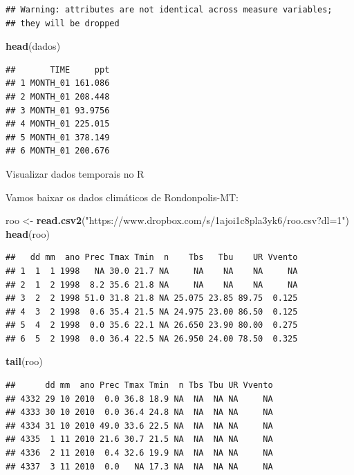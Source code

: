 \documentclass[
]{book}
\newenvironment{Shaded}{\begin{snugshade}}{\end{snugshade}}
\newcommand{\KeywordTok}[1]{\textcolor[rgb]{0.13,0.29,0.53}{\textbf{#1}}}
\newcommand{\NormalTok}[1]{#1}
\newcommand{\StringTok}[1]{\textcolor[rgb]{0.31,0.60,0.02}{#1}}
\begin{document}
\begin{verbatim}
## Warning: attributes are not identical across measure variables;
## they will be dropped
\end{verbatim}

\begin{Shaded}
\begin{Highlighting}[]
\KeywordTok{head}\NormalTok{(dados)}
\end{Highlighting}
\end{Shaded}

\begin{verbatim}
##       TIME     ppt
## 1 MONTH_01 161.086
## 2 MONTH_01 208.448
## 3 MONTH_01 93.9756
## 4 MONTH_01 225.015
## 5 MONTH_01 378.149
## 6 MONTH_01 200.676
\end{verbatim}

Visualizar dados temporais no R

Vamos baixar os dados climáticos de Rondonpolis-MT:

\begin{Shaded}
\begin{Highlighting}[]
\NormalTok{roo <-}\StringTok{ }\KeywordTok{read.csv2}\NormalTok{(}\StringTok{"https://www.dropbox.com/s/1ajoi1c8pla3yk6/roo.csv?dl=1"}\NormalTok{)}
\KeywordTok{head}\NormalTok{(roo)}
\end{Highlighting}
\end{Shaded}

\begin{verbatim}
##   dd mm  ano Prec Tmax Tmin  n    Tbs   Tbu    UR Vvento
## 1  1  1 1998   NA 30.0 21.7 NA     NA    NA    NA     NA
## 2  1  2 1998  8.2 35.6 21.8 NA     NA    NA    NA     NA
## 3  2  2 1998 51.0 31.8 21.8 NA 25.075 23.85 89.75  0.125
## 4  3  2 1998  0.6 35.4 21.5 NA 24.975 23.00 86.50  0.125
## 5  4  2 1998  0.0 35.6 22.1 NA 26.650 23.90 80.00  0.275
## 6  5  2 1998  0.0 36.4 22.5 NA 26.950 24.00 78.50  0.325
\end{verbatim}

\begin{Shaded}
\begin{Highlighting}[]
\KeywordTok{tail}\NormalTok{(roo)}
\end{Highlighting}
\end{Shaded}

\begin{verbatim}
##      dd mm  ano Prec Tmax Tmin  n Tbs Tbu UR Vvento
## 4332 29 10 2010  0.0 36.8 18.9 NA  NA  NA NA     NA
## 4333 30 10 2010  0.0 36.4 24.8 NA  NA  NA NA     NA
## 4334 31 10 2010 49.0 33.6 22.5 NA  NA  NA NA     NA
## 4335  1 11 2010 21.6 30.7 21.5 NA  NA  NA NA     NA
## 4336  2 11 2010  0.4 32.6 19.9 NA  NA  NA NA     NA
## 4337  3 11 2010  0.0   NA 17.3 NA  NA  NA NA     NA
\end{verbatim}
\end{document}
